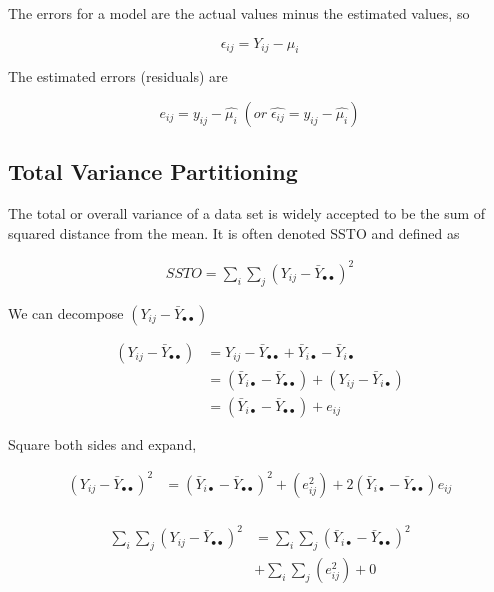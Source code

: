 \documentclass[10pt]{article}
\newcommand{\mean}[1]{\mu_{#1}}
\newcommand{\err}[1]{\epsilon_{#1}}
\begin{document}
\begin{multicols}{3}
    The errors for a model are the actual values minus the estimated values, so

    \begin{equation*}
        \err{ij} = Y_{ij} - \mean{i}
    \end{equation*}

    The estimated errors (residuals) are 

    \begin{equation*}
        e_{ij} = y_{ij} - \hat{\mean{i}} \; (or \; \hat{\err{ij}} = y_{ij} - \hat{\mean{i}})
    \end{equation*}

    \subsection{Total Variance Partitioning}

    The total or overall variance of a data set is widely accepted to be the sum of squared distance from the mean. It is often denoted SSTO and defined as 

    \begin{align*}
        SSTO = \sum_i \sum_j (Y_{ij} - \bar Y_{\bullet\bullet})^2
    \end{align*}

    We can decompose $(Y_{ij} - \bar Y_{\bullet\bullet})$

    \begin{align*}
        (Y_{ij} - \bar Y_{\bullet\bullet}) & = Y_{ij} - \bar Y_{\bullet\bullet} + \bar Y_{i\bullet} - \bar Y_{i\bullet} \\
            & = (\bar Y_{i\bullet} - \bar Y_{\bullet\bullet}) + (Y_{ij} - \bar Y_{i\bullet}) \\
            & = (\bar Y_{i\bullet} - \bar Y_{\bullet\bullet}) + e_{ij}
    \end{align*}

    \newcommand{\bul}{\bullet}

    Square both sides and expand,

    \begin{align*}
        (Y_{ij} - \bar Y_{\bul\bul})^2 & = (\bar Y_{i\bul} - \bar Y_{\bul\bul})^2 + (e_{ij}^2) + 2(\bar Y_{i\bul} - \bar Y_{\bul\bul}) e_{ij} \\
    \end{align*}

    \begin{align*}
        \sum_i \sum_j (Y_{ij} - \bar Y_{\bul\bul})^2 & = \sum_i \sum_j (\bar Y_{i\bul} - \bar Y_{\bul\bul})^2  \\
        & + \sum_i \sum_j(e_{ij}^2) + 0 \\
    \end{align*}


\end{multicols}
\end{document}
